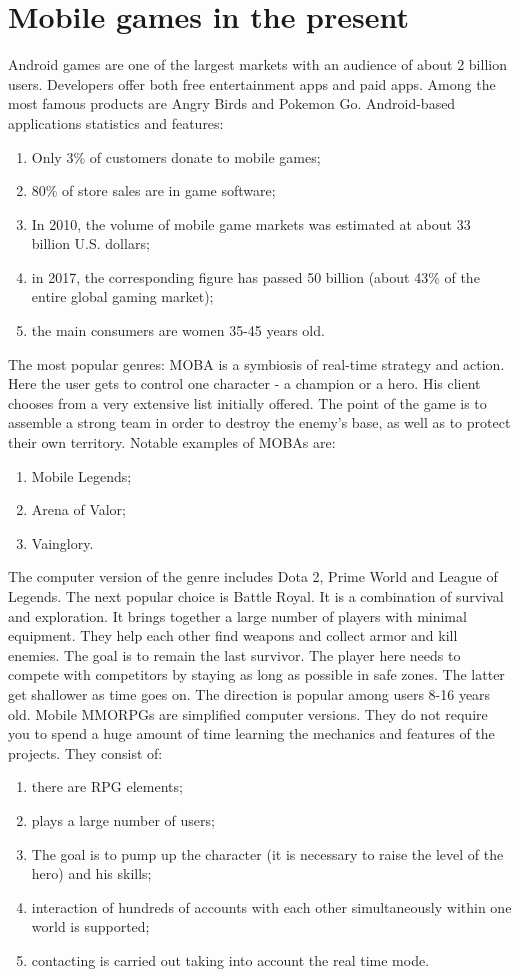 \documentclass[10pt,oneside,a4paper]{article}
\begin{document}
\section*{Mobile games in the present}
Android games are one of the largest markets with an audience of about 2 billion users. Developers offer both free entertainment apps and paid apps. Among the most famous products are Angry Birds and Pokemon Go.
Android-based applications statistics and features:
\begin{enumerate}
\item Only 3\% of customers donate to mobile games;
\item 80\% of store sales are in game software;
\item In 2010, the volume of mobile game markets was estimated at about 33 billion U.S. dollars;
\item in 2017, the corresponding figure has passed 50 billion (about 43\% of the entire global gaming market);
\item the main consumers are women 35-45 years old.
\end{enumerate}
The most popular genres:
MOBA is a symbiosis of real-time strategy and action. 
Here the user gets to control one character - a champion or a hero.
 His client chooses from a very extensive list initially offered.
The point of the game is to assemble a strong team in order to destroy the enemy's base, as well as to protect their own territory. 
Notable examples of MOBAs are:
\begin{enumerate}
\item Mobile Legends;
\item Arena of Valor;
\item Vainglory.
\end{enumerate}
The computer version of the genre includes Dota 2, Prime World and League of Legends.
 The next popular choice is Battle Royal.
 It is a combination of survival and exploration.
 It brings together a large number of players with minimal equipment.
 They help each other find weapons and collect armor and kill enemies.
The goal is to remain the last survivor. 
The player here needs to compete with competitors by staying as long as possible in safe zones.
 The latter get shallower as time goes on. 
The direction is popular among users 8-16 years old.
Mobile MMORPGs are simplified computer versions.
 They do not require you to spend a huge amount of time learning the mechanics and features of the projects. They consist of:
\begin{enumerate}
\item there are RPG elements;
\item plays a large number of users;
\item The goal is to pump up the character (it is necessary to raise the level of the hero) and his skills;
\item interaction of hundreds of accounts with each other simultaneously within one world is supported;
\item contacting is carried out taking into account the real time mode.
\end{enumerate}
\end{document}
